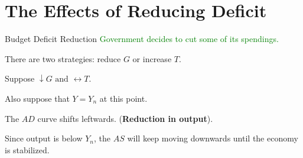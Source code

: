 \documentclass[shownotes,11pt, aspectratio=169]{beamer}
\newenvironment{wideitemize}{\itemize\addtolength{\itemsep}{10pt}}{\enditemize}
\begin{document}
\begin{frame}
\end{frame}

\section{The Effects of Reducing Deficit}
\begin{frame}{Budget Deficit Reduction}
\textcolor{green}{Government decides to cut some of its spendings.}
\begin{wideitemize}
\item There are two strategies: reduce $G$ or increase $T$. 
\item Suppose $\downarrow G \text{ and } \leftrightarrow T$.
\item Also suppose that $Y = Y_n$ at this point.
\pause
\item The $AD$ curve shifts leftwards. (\textbf{Reduction in output}).
\item Since output is below $Y_n$, the $AS$ will keep moving downwards until the economy is stabilized.
\end{wideitemize}
\end{frame}
\end{document}
